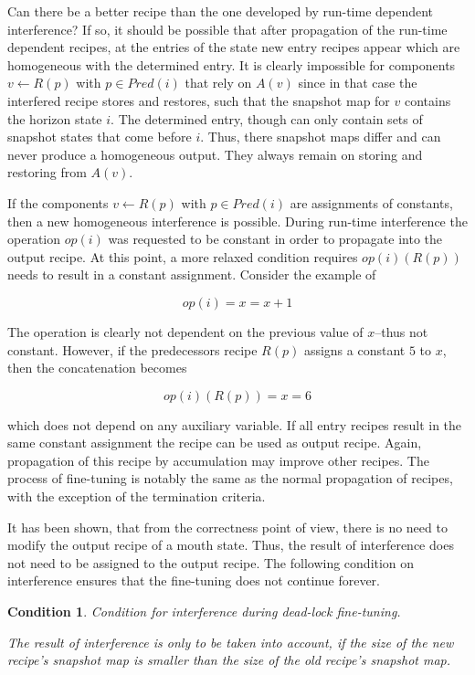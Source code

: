 \documentclass[12pt,a4paper]{scrartcl}
\theoremstyle{break}
\newtheorem{condition}{Condition}
\begin{document}
Can there be a better recipe than the one developed by run-time dependent
interference? If so, it should be possible that after propagation of the
run-time dependent recipes, at the entries of the state new entry recipes
appear which are homogeneous with the determined entry. It is clearly
impossible for components $v \leftarrow R(p)$ with $p \in Pred(i)$ that rely on
$A(v)$ since in that case the interfered recipe stores and restores, such that
the snapshot map for $v$ contains the horizon state $i$. The determined entry,
though can only contain sets of snapshot states that come before $i$. Thus,
there snapshot maps differ and can never produce a homogeneous output. They
always remain on storing and restoring from $A(v)$.

If the components $v \leftarrow R(p)$ with $p \in Pred(i)$ are assignments of
constants, then a new homogeneous interference is possible. During run-time
interference the operation $op(i)$ was requested to be constant in order to
propagate into the output recipe. At this point, a more relaxed condition
requires $op(i)(R(p))$ needs to result in a constant assignment. Consider the
example of 

\begin{equation}
                       op(i) = { x = x + 1 }
\end{equation}

The operation is clearly not dependent on the previous value of $x$--thus not
constant. However, if the predecessors recipe $R(p)$ assigns a constant $5$ to
$x$, then the concatenation becomes

\begin{equation}
                       op(i)(R(p)) = { x = 6 }
\end{equation}

which does not depend on any auxiliary variable. If all entry recipes result in
the same constant assignment the recipe can be used as output recipe. Again,
propagation of this recipe by accumulation may improve other recipes. The process
of fine-tuning is notably the same as the normal propagation of recipes, with 
the exception of the termination criteria.

It has been shown, that from the correctness point of view, there is no need to
modify the output recipe of a mouth state. Thus, the result of interference
does not need to be assigned to the output recipe. The following condition 
on interference ensures that the fine-tuning does not continue forever.

\begin{condition}
Condition for interference during dead-lock fine-tuning.

The result of interference is only to be taken into account, if the size of the
new recipe's snapshot map is smaller than the size of the old recipe's snapshot
map.  
\end{condition}
\end{document}
